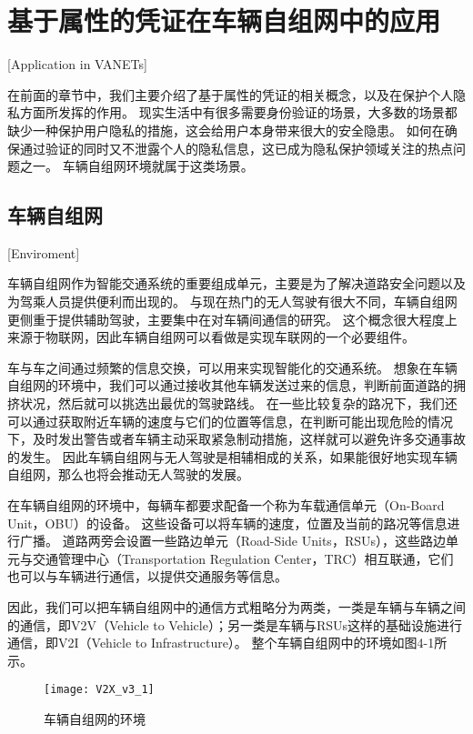 

\chapter{基于属性的凭证在车辆自组网中的应用}[Application in VANETs]

在前面的章节中，我们主要介绍了基于属性的凭证的相关概念，以及在保护个人隐私方面所发挥的作用。
现实生活中有很多需要身份验证的场景，大多数的场景都缺少一种保护用户隐私的措施，这会给用户本身带来很大的安全隐患。
如何在确保通过验证的同时又不泄露个人的隐私信息，这已成为隐私保护领域关注的热点问题之一。
车辆自组网环境就属于这类场景。

\section{车辆自组网}[Enviroment]

车辆自组网作为智能交通系统的重要组成单元，主要是为了解决道路安全问题以及为驾乘人员提供便利而出现的。
与现在热门的无人驾驶有很大不同，车辆自组网更侧重于提供辅助驾驶，主要集中在对车辆间通信的研究。
这个概念很大程度上来源于物联网，因此车辆自组网可以看做是实现车联网的一个必要组件。

车与车之间通过频繁的信息交换，可以用来实现智能化的交通系统。
想象在车辆自组网的环境中，我们可以通过接收其他车辆发送过来的信息，判断前面道路的拥挤状况，然后就可以挑选出最优的驾驶路线。
在一些比较复杂的路况下，我们还可以通过获取附近车辆的速度与它们的位置等信息，在判断可能出现危险的情况下，及时发出警告或者车辆主动采取紧急制动措施，这样就可以避免许多交通事故的发生。
因此车辆自组网与无人驾驶是相辅相成的关系，如果能很好地实现车辆自组网，那么也将会推动无人驾驶的发展。

在车辆自组网的环境中，每辆车都要求配备一个称为车载通信单元（On-Board Unit，OBU）的设备。
这些设备可以将车辆的速度，位置及当前的路况等信息进行广播。
道路两旁会设置一些路边单元（Road-Side Units，RSUs），这些路边单元与交通管理中心（Transportation Regulation Center，TRC）相互联通，它们也可以与车辆进行通信，以提供交通服务等信息。

因此，我们可以把车辆自组网中的通信方式粗略分为两类，一类是车辆与车辆之间的通信，即V2V（Vehicle to Vehicle）；另一类是车辆与RSUs这样的基础设施进行通信，即V2I（Vehicle to Infrastructure）。
整个车辆自组网中的环境如图4-1所示。

\begin{figure}[h]
\centering
\texttt{[image: V2X\_v3\_1]}
\caption{车辆自组网的环境}
\end{figure}


